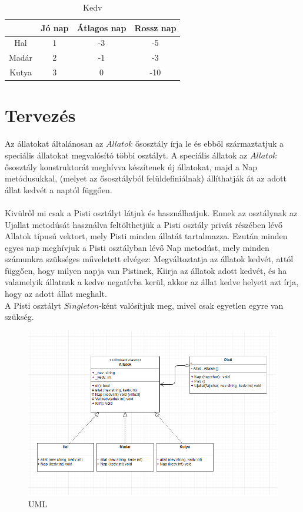 \documentclass[a4paper]{article}
\begin{document}
		\begin{table}[h!]
			\caption{Kedv}
			\label{tab:kedv}
			\begin{center}
				\begin{tabular}{|c|c|c|c|}
					\hline 
					& Jó nap & Átlagos nap & Rossz nap\\ 
					\hline 
					Hal & 1 & -3 &  -5 \\ 					
					\hline 
					Madár & 2 & -1 & -3 \\ 
					\hline 
					Kutya & 3 & 0 & -10 \\ 
					\hline 
				\end{tabular} 
			\end{center}
		\end{table}
			
			\newpage
			\section{Tervezés}
		Az állatokat általánosan az $Allatok$ ősosztály írja le és ebből származtatjuk a speciális állatokat megvalósító többi osztályt. A speciális állatok az $Allatok$ ősosztály konstruktorát meghívva készítenek új állatokat, majd a Nap metódusukkal, (melyet az ősosztályból felüldefiniálnak) állíthatják át az adott állat kedvét a naptól függően.\\\\
		Kivülről mi csak a Pisti osztályt látjuk és használhatjuk. Ennek az osztálynak az Ujallat metodúsát használva feltölthetjük a Pisti osztály privát részében lévő Allatok típusú vektort, mely Pisti minden állatát tartalmazza. Ezután minden egyes nap meghívjuk a Pisti osztályban lévő Nap metodúst, mely minden számunkra szükséges műveletett elvégez: Megváltoztatja az állatok kedvét, attól függően, hogy milyen napja van Pistinek, Kiirja az állatok adott kedvét, és ha valamelyik állatnak a kedve negatívba kerül, akkor az állat kedve helyett azt írja, hogy az adott állat meghalt.\\
		A Pisti osztályt $Singleton$-ként valósítjuk meg, mivel csak egyetlen egyre van szükség.
			\begin{figure}[h!]
				\includegraphics[width=\linewidth]{uml.png}
				\caption{UML}
				\label{fig:uml}
			\end{figure}	
	
\end{document}
